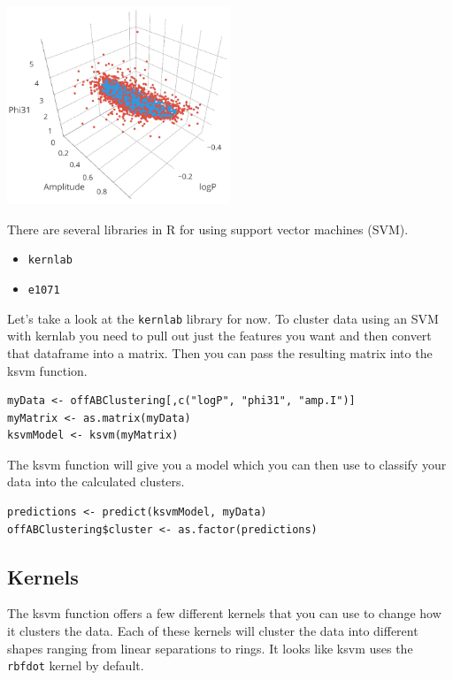 \begin{center}
	\includegraphics[width=0.5\textwidth]{images/ksvm_01.png}
\end{center}

There are several libraries in R for using support vector machines (SVM).

\begin{itemize}
	\item \verb|kernlab|
	\item \verb|e1071|
\end{itemize}

Let's take a look at the \verb|kernlab| library for now. To cluster data using an SVM with kernlab you need to pull out just the features you want and then convert that dataframe into a matrix. Then you can pass the resulting matrix into the ksvm function.

\begin{verbatim}
myData <- offABClustering[,c("logP", "phi31", "amp.I")]
myMatrix <- as.matrix(myData)
ksvmModel <- ksvm(myMatrix)
\end{verbatim}

The ksvm function will give you a model which you can then use to classify your data into the calculated clusters.

\begin{verbatim}
predictions <- predict(ksvmModel, myData)
offABClustering$cluster <- as.factor(predictions)
\end{verbatim}

\subsection{Kernels}
The ksvm function offers a few different kernels that you can use to change how it clusters the data. Each of these kernels will cluster the data into different shapes ranging from linear separations to rings. It looks like ksvm uses the \verb|rbfdot| kernel by default.

